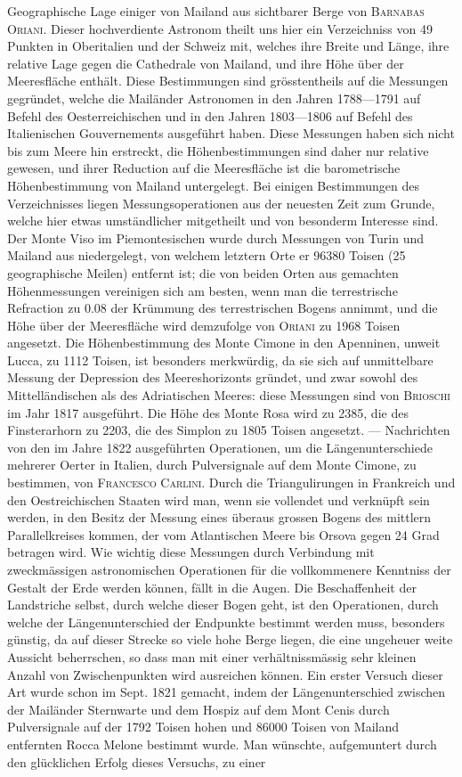Geographische Lage einiger von Mailand aus sichtbarer Berge von \textsc{Barnabas Oriani}. Dieser hochverdiente Astronom theilt uns hier ein Verzeichniss von 49 Punkten in Oberitalien und der Schweiz mit, welches ihre Breite und Länge, ihre relative Lage gegen die Cathedrale von Mailand, und ihre Höhe über der Meeresfläche enthält. Diese Bestimmungen sind grösstentheils auf die Messungen gegründet, welche die Mailänder Astronomen in den Jahren 1788---1791 auf Befehl des Oesterreichischen und in den Jahren 1803---1806 auf Befehl des Italienischen Gouvernements ausgeführt haben. Diese Messungen haben sich nicht bis zum Meere hin erstreckt, die Höhenbestimmungen sind daher nur relative gewesen, und ihrer Reduction auf die Meeresfläche ist die barometrische Höhenbestimmung von Mailand untergelegt. Bei einigen Bestimmungen des Verzeichnisses liegen Messungsoperationen aus der neuesten Zeit zum Grunde, welche hier etwas umständlicher mitgetheilt und von besonderm Interesse sind. Der Monte Viso im Piemontesischen wurde durch Messungen von Turin und Mailand aus niedergelegt, von welchem letztern Orte er 96380 Toisen (25 geographische Meilen) entfernt ist; die von beiden Orten aus gemachten Höhenmessungen vereinigen sich am besten, wenn man die terrestrische Refraction zu 0.08 der Krümmung des terrestrischen Bogens annimmt, und die Höhe über der Meeresfläche wird demzufolge von \textsc{Oriani} zu 1968 Toisen angesetzt. Die Höhenbestimmung des Monte Cimone in den Apenninen, unweit Lucca, zu 1112 Toisen, ist besonders merkwürdig, da sie sich auf unmittelbare Messung der Depression des Meereshorizonts gründet, und zwar sowohl des Mittelländischen als des Adriatischen Meeres: diese Messungen sind von \textsc{Brioschi} im Jahr 1817 ausgeführt. Die Höhe des Monte Rosa wird zu 2385, die des Finsterarhorn zu 2203, die des Simplon zu 1805 Toisen angesetzt. --- Nachrichten von den im Jahre 1822 ausgeführten Operationen, um die Längenunterschiede mehrerer Oerter in Italien, durch Pulversignale auf dem Monte Cimone, zu bestimmen, von \textsc{Francesco Carlini}. Durch die Triangulirungen in Frankreich und den Oestreichischen Staaten wird man, wenn sie vollendet und verknüpft sein werden, in den Besitz der Messung eines überaus grossen Bogens des mittlern Parallelkreises kommen, der vom Atlantischen Meere bis Orsova gegen 24 Grad betragen wird. Wie wichtig diese Messungen durch Verbindung mit zweckmässigen astronomischen Operationen für die vollkommenere Kenntniss der Gestalt der Erde werden können, fällt in die Augen. Die Beschaffenheit der Landstriche selbst, durch welche dieser Bogen geht, ist den Operationen, durch welche der Längenunterschied der Endpunkte bestimmt werden muss, besonders günstig, da auf dieser Strecke so viele hohe Berge liegen, die eine ungeheuer weite Aussicht beherrschen, so dass man mit einer verhältnissmässig sehr kleinen Anzahl von Zwischenpunkten wird ausreichen können. Ein erster Versuch dieser Art wurde schon im Sept. 1821 gemacht, indem der Längenunterschied zwischen der Mailänder Sternwarte und dem Hospiz auf dem Mont Cenis durch Pulversignale auf der 1792 Toisen hohen und 86000 Toisen von Mailand entfernten Rocca Melone bestimmt wurde. Man wünschte, aufgemuntert durch den glücklichen Erfolg dieses Versuchs, zu einer\par
